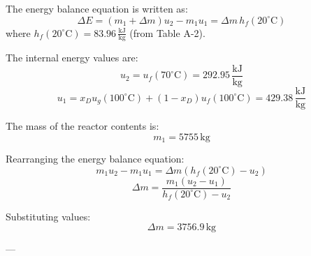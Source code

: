 The energy balance equation is written as:  
\[
\Delta E = (m_1 + \Delta m) u_2 - m_1 u_1 = \Delta m \, h_f(20^\circ\text{C})
\]  
where \( h_f(20^\circ\text{C}) = 83.96 \, \frac{\text{kJ}}{\text{kg}} \) (from Table A-2).  

The internal energy values are:  
\[
u_2 = u_f(70^\circ\text{C}) = 292.95 \, \frac{\text{kJ}}{\text{kg}}
\]  
\[
u_1 = x_D u_g(100^\circ\text{C}) + (1 - x_D) u_f(100^\circ\text{C}) = 429.38 \, \frac{\text{kJ}}{\text{kg}}
\]  

The mass of the reactor contents is:  
\[
m_1 = 5755 \, \text{kg}
\]  

Rearranging the energy balance equation:  
\[
m_1 u_2 - m_1 u_1 = \Delta m (h_f(20^\circ\text{C}) - u_2)
\]  
\[
\Delta m = \frac{m_1 (u_2 - u_1)}{h_f(20^\circ\text{C}) - u_2}
\]  

Substituting values:  
\[
\Delta m = 3756.9 \, \text{kg}
\]  

---